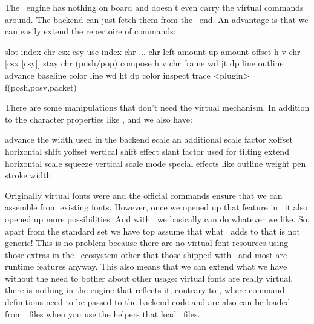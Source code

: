 The \LUAMETATEX\ engine has nothing on board and doesn't even carry the virtual
commands around. The backend can just fetch them from the \LUA\ end. An advantage is
that we can easily extend the repertoire of commands:

\starttabulate[|w(4em)||||]
\NC slot     \NC \textplus  \NC index chr csx csy                            \NC \NC \NR
\NC use      \NC \textplus  \NC index chr ... chr                            \NC \NC \NR
\NC left     \NC \textplus  \NC amount                                       \NC \NC \NR
\NC up       \NC \textplus  \NC amount                                       \NC \NC \NR
\NC offset   \NC \textplus  \NC h v chr [csx [csy]]                          \NC \NC \NR
\NC stay     \NC \textplus  \NC chr (push/pop)                               \NC \NC \NR
\NC compose  \NC \textplus  \NC h v chr                                      \NC \NC \NR
\NC frame    \NC \textplus  \NC wd jt dp line outline advance baseline color \NC \NC \NR
\NC line     \NC \textplus  \NC wd ht dp color                               \NC \NC \NR
\NC inspect  \NC \textplus  \NC                                              \NC \NC \NR
\NC trace    \NC \textplus  \NC                                              \NC \NC \NR
\NC <plugin> \NC \textplus  \NC                                              \NC f(posh,posv,packet) \NC \NR
\stoptabulate

There are some manipulations that don't need the virtual mechanism. In addition to the
character properties like ,  and  we also have:

\starttabulate[||||]
\NC advance \NC         \NC the width used in the backend \NC \NR
\NC scale   \NC         \NC an additional scale factor    \NC \NR
\NC xoffset \NC         \NC horizontal shift              \NC \NR
\NC yoffset \NC         \NC vertical shift                \NC \NR
\NC effect  \NC slant   \NC factor used for tilting       \NC \NR
\NC         \NC extend  \NC horizontal scale              \NC \NR
\NC         \NC squeeze \NC vertical scale               \NC \NR
\NC         \NC mode    \NC special effects like outline \NC \NR
\NC         \NC weight  \NC pen stroke width             \NC \NR
\stoptabulate

Originally virtual fonts were  and the official commands ensure
that we can assemble from existing fonts. However, once we opened up that feature
in \LUATEX\ it also opened up more possibilities. And with \LUAMETATEX\ we
basically can do whatever we like. So, apart from the standard set we have top
assume that what \CONTEXT\ adds to that is not generic! This is no problem
because there are no virtual font resources using those extras in the \TEX\
ecosystem other that those shipped with \CONTEXT\ and most are runtime features
anyway. This also means that we can extend what we have without the need to
bother about other usage: virtual fonts are really virtual, there is nothing in
the engine that reflects it, contrary to \LUATEX, where command definitions need
to be passed to the backend code and are also can be loaded from \VF\ files when
you use the helpers that load \TFM\ files.

\stopsection

\stopdocument
